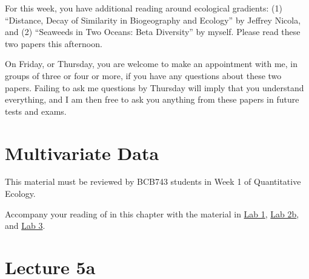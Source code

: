 \documentclass[
  11pt,
]{book}
\begin{document}
For this week, you have additional reading around ecological gradients:
(1) ``Distance, Decay of Similarity in Biogeography and Ecology'' by
Jeffrey Nicola, and (2) ``Seaweeds in Two Oceans: Beta Diversity'' by
myself. Please read these two papers this afternoon.

On Friday, or Thursday, you are welcome to make an appointment with me,
in groups of three or four or more, if you have any questions about
these two papers. Failing to ask me questions by Thursday will imply
that you understand everything, and I am then free to ask you anything
from these papers in future tests and exams.

\chapter{Multivariate Data}\label{sec-lect5}

\begin{tcolorbox}[enhanced jigsaw, arc=.35mm, titlerule=0mm, colframe=quarto-callout-note-color-frame, title=\textcolor{quarto-callout-note-color}{\faInfo}\hspace{0.5em}{BCB743}, colbacktitle=quarto-callout-note-color!10!white, opacityback=0, rightrule=.15mm, coltitle=black, left=2mm, bottomtitle=1mm, toptitle=1mm, toprule=.15mm, bottomrule=.15mm, leftrule=.75mm, opacitybacktitle=0.6, colback=white, breakable]

This material must be reviewed by BCB743 students in Week 1 of
Quantitative Ecology.

\end{tcolorbox}

\begin{tcolorbox}[enhanced jigsaw, arc=.35mm, titlerule=0mm, colframe=quarto-callout-note-color-frame, title=\textcolor{quarto-callout-note-color}{\faInfo}\hspace{0.5em}{Also see:}, colbacktitle=quarto-callout-note-color!10!white, opacityback=0, rightrule=.15mm, coltitle=black, left=2mm, bottomtitle=1mm, toptitle=1mm, toprule=.15mm, bottomrule=.15mm, leftrule=.75mm, opacitybacktitle=0.6, colback=white, breakable]

Accompany your reading of in this chapter with the material in
\href{Lab-01-introduction.html}{Lab 1}, \href{Lab-02b-env_dist.html}{Lab
2b}, and \href{Lab-03-biodiversity.html}{Lab 3}.

\end{tcolorbox}

\chapter*{Lecture 5a}\label{lecture-5a}
\end{document}
